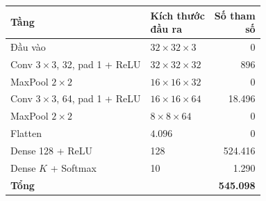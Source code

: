 \begin{tabular}{llr}
\toprule
Tầng & \makecell[l]{Kích thước\\đầu ra} & \makecell[r]{Số tham\\số} \\
\midrule
Đầu vào & $32\times32\times3$ & 0 \\
Conv $3{\times}3$, 32, pad 1 + ReLU & $32\times32\times32$ & 896 \\
MaxPool $2{\times}2$ & $16\times16\times32$ & 0 \\
Conv $3{\times}3$, 64, pad 1 + ReLU & $16\times16\times64$ & 18{.}496 \\
MaxPool $2{\times}2$ & $8\times8\times64$ & 0 \\
Flatten & $4{.}096$ & 0 \\
Dense 128 + ReLU & 128 & 524{.}416 \\
Dense $K$ + Softmax & 10 & 1{.}290 \\
\midrule
\textbf{Tổng} &  & \textbf{545{.}098} \\
\bottomrule
\end{tabular}
